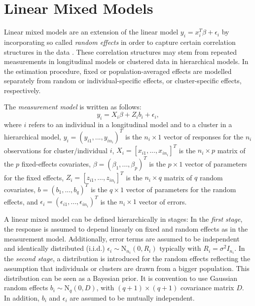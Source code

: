 \documentclass[12pt]{article}
\begin{document}
\section{Linear Mixed Models}\label{lmm}

Linear mixed models are an extension of the linear model $y_i = x^T_i\beta + \epsilon_i$ by incorporating so called \textit{random effects} in order to capture certain correlation structures in the data \cite{fahrmeir2013regression}. These correlation structures may stem from repeated measurements in longitudinal models or clustered data in hierarchical models. In the estimation procedure, fixed or population-averaged effects are modelled separately from random or individual-specific effects, or cluster-specific effects, respectively. 

The \textit{measurement model} is written as follows:
$$y_i = X_i \beta + Z_i b_i + \epsilon_i,$$
where $i$ refers to an individual in a longitudinal model and to a cluster in a
hierarchical model, $y_i = ( y_{i1},...,y_{in_i} )^T$ is the $n_i \times 1$ vector of responses for the $n_i$ observations for cluster/individual $i$, $X_i = \left[ x_{i1},..., x_{in_i}\right]^T$ is the $n_i \times p$ matrix of the $p$ fixed-effects covariates, $\beta = (\beta_1,...,\beta_p)^T$ is the $p\times1$ vector of parameters for the fixed effects, $Z_i = \left[z_{i1},...,z_{in_i}\right]^T$ is the $n_i\times q$ matrix of $q$ random covariates, $b = (b_1,...,b_q)^T$ is the $q\times1$ vector of parameters for the random effects, and $\epsilon_i = (\epsilon_{i1},...,\epsilon_{in_i})^T$ is the $n_i\times1$ vector of errors. 

A linear mixed model can be defined hierarchically in stages: 
In the \textit{first stage}, the response is assumed to depend linearly on fixed and random effects as in the measurement model. Additionally, error terms are assumed to be independent and identically distributed (i.i.d.) $\epsilon_i \sim \mathrm{N}_{n_i}(0,R_i)$ typically with $R_i=\sigma^2 I_{n_i}$. 
In the \textit{second stage}, a distribution is introduced for the random effects reflecting the assumption that individuals or clusters are drawn from a bigger population.
This distribution can be seen as a Bayesian prior. It is convention to use Gaussian random effects $b_i \sim \mathrm{N}_q(0,D)$, with $(q{+}1)\times (q{+}1)$ covariance matrix $D$. In addition, $b_i$ and $\epsilon_i$ are assumed to be mutually independent. 
\end{document}
